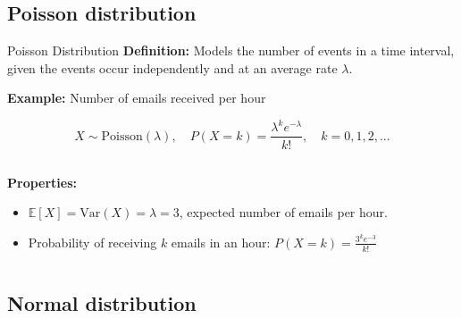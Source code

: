 \documentclass{beamer}
\begin{document}
\subsection{Poisson distribution}
\begin{frame}{Poisson Distribution}
  \textbf{Definition:} Models the number of events in a time interval, given the events occur independently and at an average rate \(\lambda\).

  \textbf{Example:} Number of emails received per hour

  \[
    X \sim \text{Poisson}(\lambda), \quad P(X=k) = \frac{\lambda^k e^{-\lambda}}{k!}, \quad k = 0,1,2,...
  \]

  \begin{columns}[T] %
    \begin{column}{0.48\textwidth}
      \textbf{Properties:}
      \begin{itemize}
      \item \( \mathbb{E}[X] = \mathrm{Var}(X) = \lambda = 3 \), expected number of emails per hour.
      \item Probability of receiving \(k\) emails in an hour:
        \(
        P(X=k) = \frac{3^k e^{-3}}{k!}
        \)
      \end{itemize}
    \end{column}

    \begin{column}{0.48\textwidth}
    \end{column}
  \end{columns}

\end{frame}


\subsection{Normal distribution}
\end{document}
